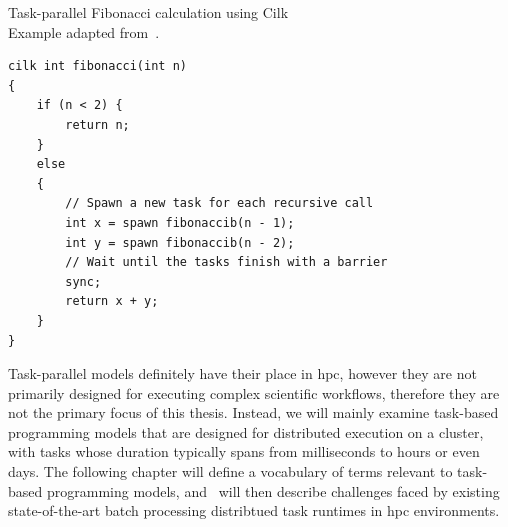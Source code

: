 \begin{listing}
	\caption{Task-parallel Fibonacci calculation using Cilk\\Example adapted from~\cite{cilk}.}
	\label{lst:cilk-fibonacci}
	\begin{verbatim}
cilk int fibonacci(int n)
{
	if (n < 2) {
		return n;
	}
	else
	{
		// Spawn a new task for each recursive call
		int x = spawn fibonaccib(n - 1);
		int y = spawn fibonaccib(n - 2);
		// Wait until the tasks finish with a barrier
		sync;
		return x + y;
	}
}
	\end{verbatim}
\end{listing}

Task-parallel models definitely have their place in \gls{hpc}, however they are
not primarily designed for executing complex scientific workflows, therefore they are not the
primary focus of this thesis. Instead, we will mainly examine task-based programming models that
are designed for distributed execution on a cluster, with tasks whose duration typically spans from
milliseconds to hours or even days. The following chapter will define a vocabulary of terms
relevant to task-based programming models, and~ will then describe challenges
faced by existing state-of-the-art batch processing distribtued task runtimes in \gls{hpc}
environments.
